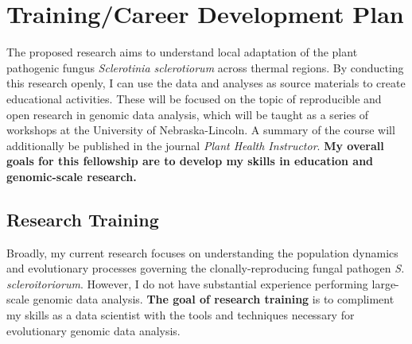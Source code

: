\documentclass[12pt,letterpaper]{article}
\title{\ruleline{Project Narrative}}
\begin{document}
\maketitle

\section{Training/Career Development Plan}




The proposed research aims to understand local adaptation of the plant pathogenic fungus \textit{Sclerotinia sclerotiorum} across thermal regions. 
By conducting this research openly, I can use the data and analyses as source materials to create educational activities. 
These will be focused on the topic of reproducible and open research in genomic data analysis,
which will be taught as a series of workshops at the University of Nebraska-Lincoln. 
A summary of the course will additionally be published in the
journal \textit{Plant Health Instructor}. 
\textbf{My overall goals for this fellowship are to develop my skills in education and genomic-scale research.} 


\subsection{Research Training}

Broadly, my current research focuses on understanding the population dynamics and evolutionary processes governing the clonally-reproducing fungal pathogen \textit{S. scleroitoriorum}.
However, I do not have substantial experience performing large-scale genomic data analysis. \textbf{The goal of research training} is to compliment my skills as a data scientist with the tools and techniques necessary for evolutionary genomic data analysis. 
\end{document}
